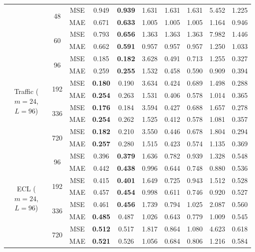 \begin{table}[t]
{\begin{tabular}{c c c||c|c||c|c|c|c|c}
  & \multirow{2}{*}{48} & MSE & 0.949 & \textbf{0.939} & 1.631 & 1.631 & 1.631 & 5.452 & 1.225 \\
  &                     & MAE & 0.671 & \textbf{0.633} & 1.005 & 1.005 & 1.005 & 1.164 & 0.946 \\
  & \multirow{2}{*}{60} & MSE & 0.793 & \textbf{0.656} & 1.363 & 1.363 & 1.363 & 7.982 & 1.446 \\
  &                     & MAE & 0.662 & \textbf{0.591} & 0.957 & 0.957 & 0.957 & 1.250 & 1.033 \\
\midrule
\multirow{8}{*}{Traffic ($m{=}24$, $L{=}96$)}
  & \multirow{2}{*}{96}  & MSE & 0.185 & \textbf{0.182} & 3.628 & 0.491 & 0.713 & 1.255 & 0.327 \\
  &                      & MAE & 0.259 & \textbf{0.255} & 1.532 & 0.458 & 0.590 & 0.909 & 0.394 \\
  & \multirow{2}{*}{192} & MSE & \textbf{0.180} & 0.190 & 3.634 & 0.424 & 0.689 & 1.498 & 0.288 \\
  &                      & MAE & \textbf{0.254} & 0.263 & 1.531 & 0.406 & 0.578 & 1.014 & 0.365 \\
  & \multirow{2}{*}{336} & MSE & \textbf{0.176} & 0.184 & 3.594 & 0.427 & 0.688 & 1.657 & 0.278 \\
  &                      & MAE & \textbf{0.254} & 0.262 & 1.525 & 0.412 & 0.578 & 1.081 & 0.357 \\
  & \multirow{2}{*}{720} & MSE & \textbf{0.182} & 0.210 & 3.550 & 0.446 & 0.678 & 1.804 & 0.294 \\
  &                      & MAE & \textbf{0.257} & 0.280 & 1.515 & 0.423 & 0.574 & 1.135 & 0.369 \\
\midrule
\multirow{8}{*}{ECL ($m{=}24$, $L{=}96$)}
  & \multirow{2}{*}{96}  & MSE & 0.396 & \textbf{0.379} & 1.636 & 0.782 & 0.939 & 1.328 & 0.548 \\
  &                      & MAE & 0.442 & \textbf{0.438} & 0.996 & 0.644 & 0.748 & 0.880 & 0.536 \\
  & \multirow{2}{*}{192} & MSE & 0.415 & \textbf{0.401} & 1.649 & 0.725 & 0.943 & 1.512 & 0.528 \\
  &                      & MAE & 0.457 & \textbf{0.454} & 0.998 & 0.611 & 0.746 & 0.920 & 0.527 \\
  & \multirow{2}{*}{336} & MSE & 0.461 & \textbf{0.456} & 1.739 & 0.794 & 1.025 & 2.087 & 0.560 \\
  &                      & MAE & \textbf{0.485} & 0.487 & 1.026 & 0.643 & 0.779 & 1.009 & 0.545 \\
  & \multirow{2}{*}{720} & MSE & \textbf{0.512} & 0.517 & 1.817 & 0.864 & 1.080 & 4.623 & 0.618 \\
  &                      & MAE & \textbf{0.521} & 0.526 & 1.056 & 0.684 & 0.806 & 1.216 & 0.584 \\
\bottomrule
\end{tabular}}
\end{table}


